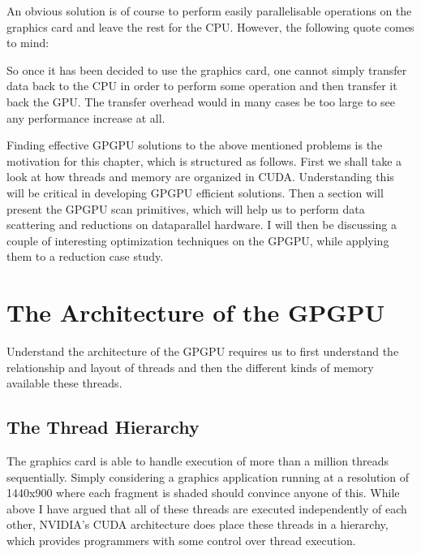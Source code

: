
An obvious solution is of course to perform easily parallelisable
operations on the graphics card and leave the rest for the
CPU. However, the following quote comes to mind:


So once it has been decided to use the graphics card, one cannot
simply transfer data back to the CPU in order to perform some
operation and then transfer it back the GPU. The transfer overhead
would in many cases be too large to see any performance increase at
all.




Finding effective GPGPU solutions to the above mentioned problems is
the motivation for this chapter, which is structured as follows.
First we shall take a look at how threads and memory are organized in
CUDA. Understanding this will be critical in developing GPGPU
efficient solutions. Then a section will present the GPGPU scan
primitives, which will help us to perform data scattering and
reductions on dataparallel hardware. I will then be discussing a
couple of interesting optimization techniques on the GPGPU, while
applying them to a reduction case study.



\section{The Architecture of the GPGPU}

Understand the architecture of the GPGPU requires us to first
understand the relationship and layout of threads and then the
different kinds of memory available these threads.

\subsection{The Thread Hierarchy}


The graphics card is able to handle execution of more than a million
threads sequentially. Simply considering a graphics application
running at a resolution of 1440x900 where each fragment is shaded
should convince anyone of this. While above I have argued that all of
these threads are executed independently of each other, NVIDIA's CUDA
architecture does place these threads in a hierarchy, which provides
programmers with some control over thread execution.

